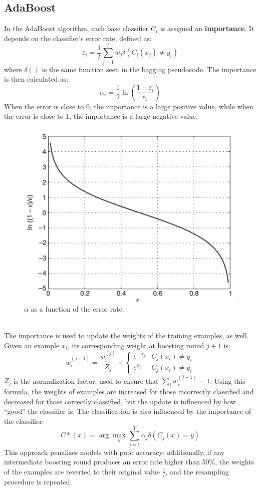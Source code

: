 \subsection{AdaBoost}

In the AdaBoost algorithm, each base classifier $C_i$ is assigned an \textbf{importance}. It depends on the classifier's error rate, defined as:
\begin{equation*}
    \varepsilon_i = \dfrac{1}{l} \sum_{j=1}^l w_j \delta(C_i(x_j) \neq y_i)
\end{equation*}
where $\delta()$ is the same function seen in the bagging pseudocode. The importance is then calculated as:
\begin{equation*}
    \alpha_i = \dfrac{1}{2} \ln \left(\dfrac{1-\varepsilon_i}{\varepsilon_i}\right)
\end{equation*}
When the error is close to 0, the importance is a large positive value, while when the error is close to 1, the importance is a large negative value.
\begin{figure}[h]
    \centering
    \includegraphics[width=0.4\linewidth]{img/importance_vs_errorrate.png}
    \caption{$\alpha$ as a function of the error rate.}
    \label{fig:importance-errorrate}
\end{figure} \\
The importance is used to update the weights of the training examples, as well. Given an example $x_i$, its corresponding weight at boosting round $j+1$ is:
\begin{equation*}
    w_i^{(j+1)} = \dfrac{w_i^{(j)}}{Z_j} \times \begin{cases}
        e^{-\alpha_j} & C_j(x_i) \neq y_i \\
        e^{\alpha_j} & C_j(x_i) \neq y_i 
    \end{cases}
\end{equation*}
$Z_j$ is the normalization factor, used to ensure that $\sum_i w_i^{(j+1)} = 1$. Using this formula, the weights of examples are increased for those incorrectly classified and decreased for those correctly classified, but the update is influenced by how ``good'' the classifier is. The classification is also influenced by the importance of the classifier:
\begin{equation*}
    C*(x) = \arg\max_y \sum_{j=1}^T \alpha_j \delta(C_j(x) = y)
\end{equation*}
This approach penalizes models with poor accuracy; additionally, if any intermediate boosting round produces an error rate higher than 50\%, the weights of the examples are reverted to their original value $\frac{1}{l}$, and the resampling procedure is repeated.

